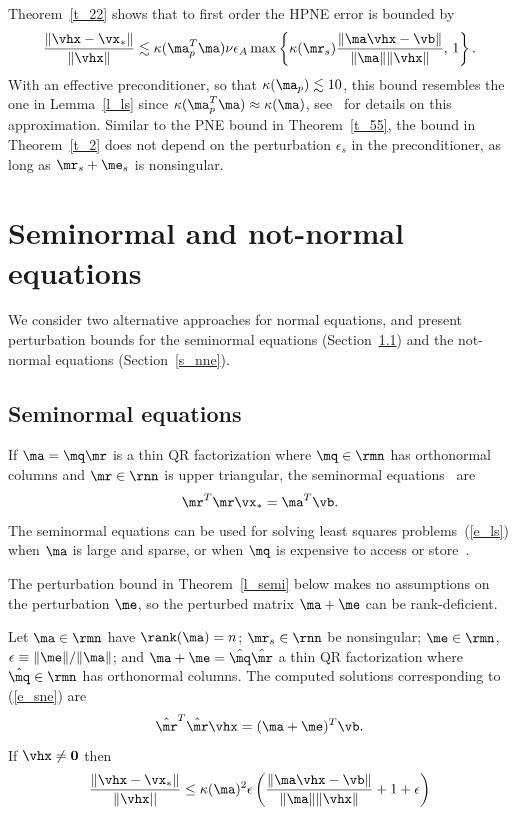 \documentclass[final]{siamart220329}%
\begin{document}
Theorem~\ref{t_22} shows that to first order the HPNE error is bounded by 
\begin{equation}\label{e_fohpne}
    \frac{\|\vhx-\vx_*\|}{\|\vhx\|}\lesssim\kappa(\ma_p^T\ma)\nu\epsilon_A
    \max\left\{\kappa(\mr_s)\frac{\|\ma\vhx-\vb\|}{\|\ma\|\|\vhx\|}, \, 1\right\}.
\end{equation}
With an effective preconditioner, so that $\kappa(\ma_p)\lesssim10$, this bound resembles the one in Lemma~\ref{l_ls} since  $\kappa(\ma_p^T\ma)\approx\kappa(\ma)$, see~\cite[Section 3]{ipsen2025solutionsquaresproblemsrandomized} for details on this approximation. Similar to the PNE bound in Theorem~\ref{t_55}, the bound in Theorem~\ref{t_2} does not depend on the perturbation $\epsilon_s$ in the preconditioner, as long as $\mr_s+\me_s$ is nonsingular.

\section{Seminormal and not-normal equations }\label{s_var}
We consider two alternative approaches for normal equations,
and present perturbation bounds for the seminormal equations (Section~\ref{s_sne}) and the not-normal equations (Section~\ref{s_nne}).

\subsection{Seminormal equations}\label{s_sne}
If $\ma=\mq\mr$ is a thin QR factorization where $\mq\in\rmn$ has orthonormal columns and $\mr\in\rnn$ is upper triangular, the seminormal equations~\cite{BJORCK198731} are
 \begin{equation}\label{e_sne}
    \mr^T\mr\vx_*=\ma^T\vb.
\end{equation}
 The seminormal equations can be used for solving least squares problems~(\ref{e_ls}) when $\ma$ is large and sparse,
 or when $\mq$ is expensive to access or store~\cite{BJORCK198731}.
 
The perturbation bound in Theorem~\ref{l_semi} below makes no  assumptions on the perturbation $\me$, so the perturbed matrix $\ma+\me$ can be rank-deficient.

\begin{theorem}\label{l_semi} 
Let $\ma\in\rmn$ have $\rank(\ma)=n$; $\mr_s\in\rnn$ be nonsingular; $\me\in\rmn$, $\epsilon\equiv\|\me\|/\|\ma\|$; 
and $\ma+\me=\hat{\mq}\hat{\mr}$ a thin QR factorization where $\hat{\mq}\in\rmn$ has orthonormal columns.
The computed solutions corresponding to (\ref{e_sne}) are
\begin{equation}\label{eq1}
       \hat{\mr}^T\hat{\mr}\vhx=(\ma+\me)^T\vb.
    \end{equation}
If $\vhx\neq\mathbf{0}$ then 
    \begin{equation}
        \frac{\|\vhx-\vx_*\|}{\|\vhx||}\leq \kappa(\ma)^2\epsilon \left(\frac{\|\ma\vhx-\vb\|}{\|\ma\|\|\vhx\|}+1+\epsilon\right)
    \end{equation}
\end{theorem}
\end{document}
